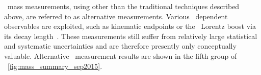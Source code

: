 \Tquark\ mass measurements, using other than the traditional techniques described above, are referred to as alternative measurements. Various \mt\ dependent observables are exploited, such as kinematic endpoints\cite{CMSCollaboration2013a} or the \bhadron\ Lorentz boost via its decay length~\cite{CMSCollaboration2013}. These measurements still suffer from relatively large statistical and systematic uncertainties and are therefore presently only conceptually valuable.
%
Alternative \mt\ measurement results are shown in the fifth group of \fig~\ref{fig:mass_summary_sep2015}.




